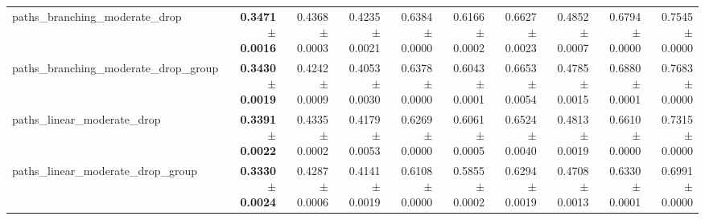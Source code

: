 \begin{tabular}{@{}lrrrrrrrrr@{}}
paths\_branching\_moderate\_drop & \textbf{0.3471 $\pm$ 0.0016} & 0.4368 $\pm$ 0.0003 & 0.4235 $\pm$ 0.0021 & 0.6384 $\pm$ 0.0000 & 0.6166 $\pm$ 0.0002 & 0.6627 $\pm$ 0.0023 & 0.4852 $\pm$ 0.0007 & 0.6794 $\pm$ 0.0000 & 0.7545 $\pm$ 0.0000 \\
paths\_branching\_moderate\_drop\_group & \textbf{0.3430 $\pm$ 0.0019} & 0.4242 $\pm$ 0.0009 & 0.4053 $\pm$ 0.0030 & 0.6378 $\pm$ 0.0000 & 0.6043 $\pm$ 0.0001 & 0.6653 $\pm$ 0.0054 & 0.4785 $\pm$ 0.0015 & 0.6880 $\pm$ 0.0001 & 0.7683 $\pm$ 0.0000 \\
paths\_linear\_moderate\_drop & \textbf{0.3391 $\pm$ 0.0022} & 0.4335 $\pm$ 0.0002 & 0.4179 $\pm$ 0.0053 & 0.6269 $\pm$ 0.0000 & 0.6061 $\pm$ 0.0005 & 0.6524 $\pm$ 0.0040 & 0.4813 $\pm$ 0.0019 & 0.6610 $\pm$ 0.0000 & 0.7315 $\pm$ 0.0000 \\
paths\_linear\_moderate\_drop\_group & \textbf{0.3330 $\pm$ 0.0024} & 0.4287 $\pm$ 0.0006 & 0.4141 $\pm$ 0.0019 & 0.6108 $\pm$ 0.0000 & 0.5855 $\pm$ 0.0002 & 0.6294 $\pm$ 0.0019 & 0.4708 $\pm$ 0.0013 & 0.6330 $\pm$ 0.0001 & 0.6991 $\pm$ 0.0000 \\
\bottomrule
\end{tabular}
